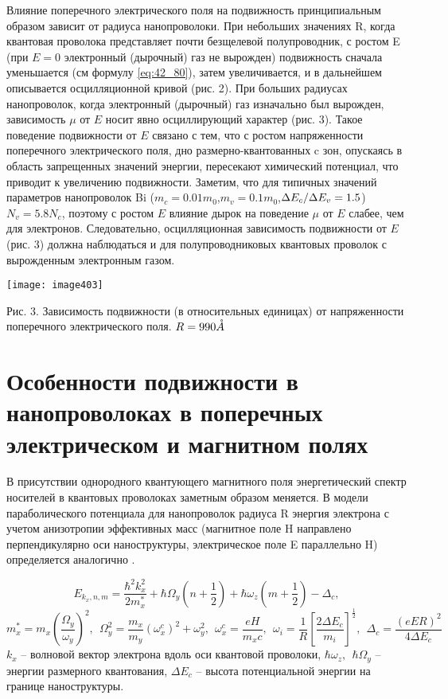 Влияние поперечного электрического поля на подвижность принципиальным образом зависит от радиуса нанопроволоки. При небольших значениях R, когда квантовая проволока представляет почти безщелевой полупроводник, с ростом E (при $E=0$ электронный (дырочный) газ не вырожден) подвижность сначала уменьшается (см формулу \eqref{eq:42_80}), затем увеличивается, и в дальнейшем описывается осцилляционной кривой (рис. 2). При больших радиусах нанопроволок, когда электронный (дырочный) газ изначально был вырожден, зависимость $\mu $ от $E$ носит явно осциллирующий характер (рис. 3). Такое поведение подвижности от $E$ связано с тем, что с ростом напряженности поперечного электрического поля, дно размерно-квантованных c зон, опускаясь в область запрещенных значений энергии, пересекают химический потенциал, что приводит к увеличению подвижности. Заметим, что для типичных значений параметров нанопроволок Bi ($m_{c} =0.01m_{0} $,$m_{v} =0.1m_{0} $,${\Delta E_{c}  \mathord{\left/{\vphantom{\Delta E_{c}  \Delta E_{v} }}\right.\kern-\nulldelimiterspace} \Delta E_{v} } =1.5$) $N_{v} =5.8N_{c} $, поэтому с ростом $E$ влияние дырок на поведение $\mu $ от $E$ слабее, чем для электронов. Следовательно, осцилляционная зависимость подвижности от $E$ (рис. 3) должна наблюдаться и для полупроводниковых квантовых проволок с вырожденным электронным газом.

\texttt{[image: image403]}

\noindent Рис. 3. Зависимость подвижности (в относительных единицах) от напряженности поперечного электрического поля. $R=990 \AA$



\section{Особенности подвижности в нанопроволоках в поперечных электрическом и магнитном полях} \label{sect4_3}

В присутствии однородного квантующего магнитного поля энергетический спектр носителей в квантовых проволоках заметным образом меняется. В модели параболического потенциала для нанопроволок радиуса R энергия электрона с учетом анизотропии эффективных масс (магнитное поле H  направлено перпендикулярно оси наноструктуры, электрическое поле E параллельно H) определяется аналогично \cite{Geiler1998}.

\begin{equation} \label{eq:43_10}
	E_{k_x,n,m}=\frac{{\hbar }^2k^2_x}{2m^*_x}+\hbar {\Omega }_y\left(n+\frac{1}{2}\right)+\hbar {\omega }_z\left(m+\frac{1}{2}\right)-{\Delta }_c,   
\end{equation}
\[
m^*_x=m_x{\left(\frac{{\Omega }_y}{{\omega }_y}\right)}^2,\ \ {\Omega }^2_y=\frac{m_x}{m_y}{\left({\omega }^c_x\right)}^2+{\omega }^2_y,\ \ {\omega }^c_x=\frac{eH}{m_xc},\ \ {\omega }_i=\frac{1}{R}{\left[\frac{2\Delta E_c}{m_i}\right]}^{\frac{1}{2}},\ \ {\Delta }_c=\frac{{\left(eER\right)}^2}{4\Delta E_c}
\]
$k_x$ -- волновой вектор электрона вдоль оси квантовой проволоки, $\hbar {\omega }_z,\ \ \hbar {\Omega }_y$ -- энергии размерного квантования, $\Delta E_c$ -- высота потенциальной энергии на границе наноструктуры.

